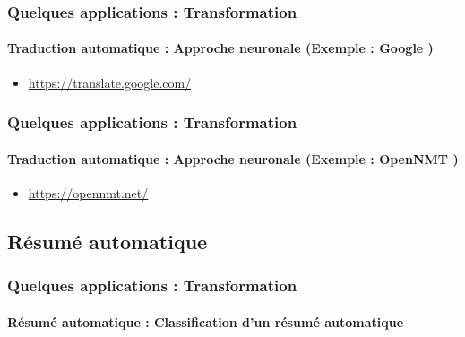\documentclass[xcolor=table]{beamer}
\begin{document}
\begin{frame}
	\frametitle{Quelques applications : Transformation}
	\framesubtitle{Traduction automatique : Approche neuronale (Exemple : Google \cite{16-wu-al} )}
	\begin{itemize}
		\item \url{https://translate.google.com/}
	\end{itemize}
	\begin{center}
	\end{center}
\end{frame}

\begin{frame}
	\frametitle{Quelques applications : Transformation}
	\framesubtitle{Traduction automatique : Approche neuronale (Exemple : OpenNMT \cite{17-klein-al})}
	\begin{itemize}
		\item \url{https://opennmt.net/}
	\end{itemize}
\end{frame}

\subsection{Résumé automatique}

\begin{frame}
	\frametitle{Quelques applications : Transformation}
	\framesubtitle{Résumé automatique : Classification d'un résumé automatique}
\end{frame}
\end{document}
